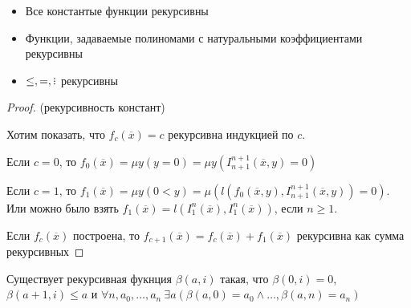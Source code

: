 \begin{exmpl}
    \begin{itemize}\
        \item Все константые функции рекурсивны
        \item Функции, задаваемые полиномами с натуральными коэффициентами рекурсивны
        \item $\le, =, \divby$ рекурсивны
    \end{itemize}
\end{exmpl}

\begin{proof}(рекурсивность констант)\

    Хотим показать, что $f_c (\overline{x}) = c$ рекурсивна индукцией по $c$.

    Если $c=0$, то $f_0 (\overline{x}) = \mu y(y=0) = \mu y (I_{n+1}^{n+1} (\overline{x}, y) =0)$

    Если $c=1$, то $f_1 (\overline{x}) = \mu y (0<y) = \mu (l(f_0 (\overline{x}, y), I_{n+1}^{n+1} (\overline{x}, y))=0)$. Или можно было взять $f_1 (\overline{x}) = l(I_1^n (\overline{x}), I_1^n (\overline{x}) )$, если $n\ge 1$.

    Если $f_c (\overline{x}) $ построена, то $f_{c+1} (\overline{x}) = f_c (\overline{x}) + f_1 (\overline{x}) $ рекурсивна как сумма рекурсивных %
\end{proof}

\begin{prop}
    Существует рекурсивная фукнция $\beta(a, i)$ такая, что $\beta(0, i) = 0$, $\beta(a+1, i)\le a$ и $\forall n, a_0, \ldots, a_n~\exists a (\beta(a, 0)=a_0 \wedge \ldots, \beta(a, n)=a_n)$
\end{prop}

